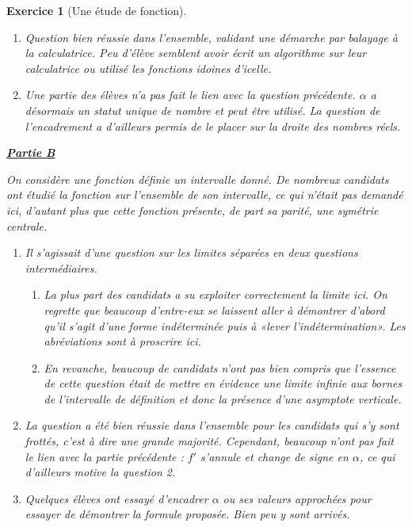 \documentclass[12pt,a4paper]{article}
\theoremstyle{break}
\theoremstyle{nobreak}
\newtheorem{exercice}{Exercice}
\theoremstyle{nonumberplain}
\begin{document}
\begin{exercice}[Une étude de fonction]
\begin{enumerate}
      Quelques élèves ont cité le théorème de la bijection, qui n'est
      plus au programme.
    \item Question bien réussie dans l'ensemble, validant une démarche
      par balayage à la calculatrice. Peu d'élève semblent avoir écrit
      un algorithme sur leur calculatrice ou utilisé les fonctions
      idoines d'icelle.
    \item Une partie des élèves n'a pas fait le lien avec la question
      précédente. $\alpha$ a désormais un statut unique de nombre et
      peut être utilisé. La question de l'encadrement a d'ailleurs
      permis de le placer sur la droite des nombres réels.
  \end{enumerate}

  \noindent\textbf{\underline{Partie B}}

  On considère une fonction définie un intervalle donné. De nombreux
  candidats ont étudié la fonction sur l'ensemble de son intervalle, ce
  qui n'était pas demandé ici, d'autant plus que cette fonction
  présente, de part sa parité, une symétrie centrale.

  \begin{enumerate}
    \item Il s'agissait d'une question sur les limites séparées en deux
      questions intermédiaires.
      \begin{enumerate}
        \item La plus part des candidats a su exploiter correctement la
          limite ici. On regrette que beaucoup d'entre-eux se laissent
          aller à démontrer d'abord qu'il s'agit d'une forme
          indéterminée puis à «lever l'indétermination». Les
          abréviations sont à proscrire ici.
        \item En revanche, beaucoup de candidats n'ont pas bien compris
          que l'essence de cette question était de mettre en évidence
          une limite infinie aux bornes de l'intervalle de définition et
          donc la présence d'une asymptote verticale.
      \end{enumerate}
    \item La question a été bien réussie dans l'ensemble pour les
      candidats qui s'y sont frottés, c'est à dire une grande majorité.
      Cependant, beaucoup n'ont pas fait le lien avec la partie
      précédente : $f'$ s'annule et change de signe en $\alpha$, ce qui
      d'ailleurs motive la question 2.
    \item Quelques élèves ont essayé d'encadrer $\alpha$ ou ses valeurs
      approchées pour essayer de démontrer la formule proposée. Bien peu
      y sont arrivés.


\end{enumerate}
\end{exercice}
\end{document}
